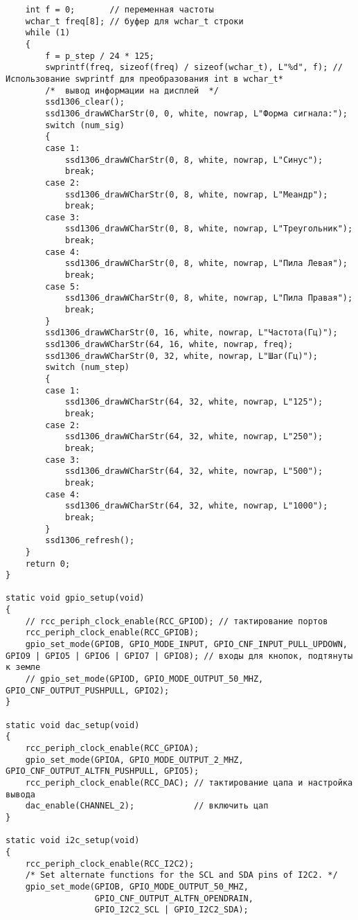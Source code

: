 \begin{code}
\begin{verbatim}
    int f = 0;       // переменная частоты
    wchar_t freq[8]; // буфер для wchar_t строки
    while (1)
    {
        f = p_step / 24 * 125;
        swprintf(freq, sizeof(freq) / sizeof(wchar_t), L"%d", f); // Использование swprintf для преобразования int в wchar_t*
        /*  вывод информации на дисплей  */
        ssd1306_clear();
        ssd1306_drawWCharStr(0, 0, white, nowrap, L"Форма сигнала:");
        switch (num_sig)
        {
        case 1:
            ssd1306_drawWCharStr(0, 8, white, nowrap, L"Синус");
            break;
        case 2:
            ssd1306_drawWCharStr(0, 8, white, nowrap, L"Меандр");
            break;
        case 3:
            ssd1306_drawWCharStr(0, 8, white, nowrap, L"Треугольник");
            break;
        case 4:
            ssd1306_drawWCharStr(0, 8, white, nowrap, L"Пила Левая");
            break;
        case 5:
            ssd1306_drawWCharStr(0, 8, white, nowrap, L"Пила Правая");
            break;
        }
        ssd1306_drawWCharStr(0, 16, white, nowrap, L"Частота(Гц)");
        ssd1306_drawWCharStr(64, 16, white, nowrap, freq);
        ssd1306_drawWCharStr(0, 32, white, nowrap, L"Шаг(Гц)");
        switch (num_step)
        {
        case 1:
            ssd1306_drawWCharStr(64, 32, white, nowrap, L"125");
            break;
        case 2:
            ssd1306_drawWCharStr(64, 32, white, nowrap, L"250");
            break;
        case 3:
            ssd1306_drawWCharStr(64, 32, white, nowrap, L"500");
            break;
        case 4:
            ssd1306_drawWCharStr(64, 32, white, nowrap, L"1000");
            break;
        }
        ssd1306_refresh();
    }
    return 0;
}

static void gpio_setup(void)
{
    // rcc_periph_clock_enable(RCC_GPIOD); // тактирование портов
    rcc_periph_clock_enable(RCC_GPIOB);
    gpio_set_mode(GPIOB, GPIO_MODE_INPUT, GPIO_CNF_INPUT_PULL_UPDOWN, GPIO9 | GPIO5 | GPIO6 | GPIO7 | GPIO8); // входы для кнопок, подтянуты к земле
    // gpio_set_mode(GPIOD, GPIO_MODE_OUTPUT_50_MHZ, GPIO_CNF_OUTPUT_PUSHPULL, GPIO2);
}

static void dac_setup(void)
{
    rcc_periph_clock_enable(RCC_GPIOA);
    gpio_set_mode(GPIOA, GPIO_MODE_OUTPUT_2_MHZ, GPIO_CNF_OUTPUT_ALTFN_PUSHPULL, GPIO5);
    rcc_periph_clock_enable(RCC_DAC); // тактирование цапа и настройка вывода
    dac_enable(CHANNEL_2);            // включить цап
}

static void i2c_setup(void)
{
    rcc_periph_clock_enable(RCC_I2C2);
    /* Set alternate functions for the SCL and SDA pins of I2C2. */
    gpio_set_mode(GPIOB, GPIO_MODE_OUTPUT_50_MHZ,
                  GPIO_CNF_OUTPUT_ALTFN_OPENDRAIN,
                  GPIO_I2C2_SCL | GPIO_I2C2_SDA);


\end{verbatim}
\end{code}
